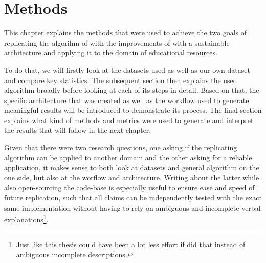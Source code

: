 \chapter{Methods}


This chapter explains the methods that were used to achieve the two goals of replicating the algorihm of \textcite{Derrac2015} with the improvements of \cite{Ager2018,Alshaikh2020} with a sustainable architecture and applying it to the domain of educational resources.  

To do that, we will firstly look at the datasets \mainalgos used as well as our own dataset and compare key statistics. The subsequent section then explains the used algorithm broadly before looking at each of its steps in detail. Based on that, the specific architecture that was created as well as the workflow used to generate meaningful results will be introduced to demonstrate its process. The final section explains what kind of methods and metrics were used to generate and interpret the results that will follow in the next chapter.

Given that there were two research questions, one asking if the replicating algorithm can be applied to another domain and the other asking for a reliable application, it makes sense to both look at datasets and general algorithm on the one side, but also at the worflow and architecture. Writing about the latter while also open-sourcing the code-base is especially useful to ensure ease and speed of future replication, such that all claims can be independently tested with the exact same implementation without having to rely on ambiguous and incomplete verbal explanations\footnote{Just like this thesis could have been a lot less effort if \mainalgos did that instead of ambiguous incomplete descriptions. }. 




